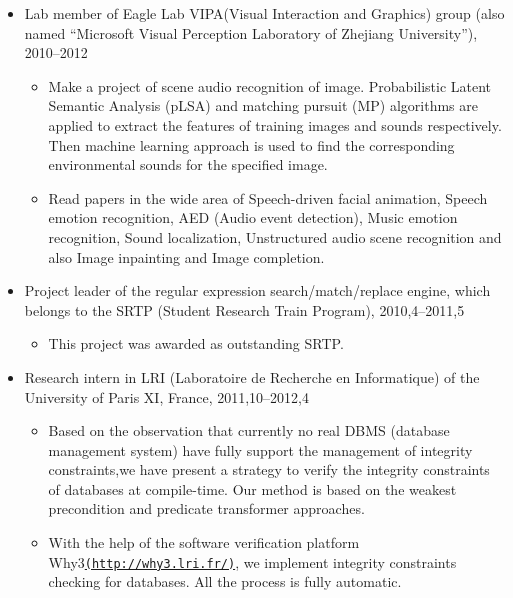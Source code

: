 \documentclass[letterpaper]{article}
\begin{document}
\begin{itemize}
\item Lab member of Eagle Lab VIPA(Visual Interaction and Graphics) group (also named ``Microsoft Visual Perception Laboratory of Zhejiang University''), 2010--2012
    \begin{itemize}
    \item Make a project of scene audio recognition of image. Probabilistic Latent Semantic Analysis (pLSA) and matching pursuit (MP) algorithms are applied to extract the features of training images and sounds respectively. Then machine learning approach is used to ﬁnd the corresponding environmental sounds for the speciﬁed image.
	\item  Read papers in the wide area of Speech-driven facial animation, Speech emotion recognition, AED (Audio event detection), Music emotion recognition, Sound localization, Unstructured audio scene recognition and also Image inpainting and Image completion.
    \end{itemize}
\item Project leader of the regular expression search/match/replace engine, which belongs to the SRTP (Student Research Train Program), 2010,4--2011,5
    \begin{itemize}
	\item This project was awarded as outstanding SRTP.
    \end{itemize} 
\item Research intern in LRI (Laboratoire de Recherche en Informatique) of the University of Paris XI, France, 2011,10--2012,4
    \begin{itemize}
	  \item Based on the observation that currently no real DBMS (database management system) have fully support the management of integrity constraints,we have present a strategy to verify the integrity constraints of databases at compile-time. Our method is based on the weakest precondition and predicate transformer approaches. 
	  \item With the help of the software verification platform Why3\href{http://why3.lri.fr/}{\tt (http://why3.lri.fr/)}, we implement integrity constraints checking for databases. All the process is fully automatic.
    \end{itemize} 
\end{itemize}
\end{document}
